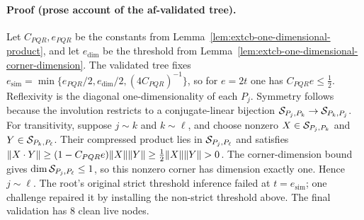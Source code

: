 \paragraph{Proof (prose account of the af-validated tree).}
Let $C_{PQR},e_{PQR}$ be the constants from
Lemma~\ref{lem:extcb-one-dimensional-product}, and let $e_{\dim}$ be the threshold from
Lemma~\ref{lem:extcb-one-dimensional-corner-dimension}. The validated tree fixes
$e_{\mathrm{sim}}=\min\{e_{PQR}/2,e_{\dim}/2,(4C_{PQR})^{-1}\}$, so for $e=2t$
one has $C_{PQR}e\le\tfrac12$. Reflexivity is the diagonal one-dimensionality of each
$P_j$. Symmetry follows because the involution restricts to a conjugate-linear bijection
$\mathcal S_{P_j,P_k}\to\mathcal S_{P_k,P_j}$.
For transitivity, suppose $j\sim k$ and $k\sim\ell$, and choose nonzero
$X\in\mathcal S_{P_j,P_k}$ and $Y\in\mathcal S_{P_k,P_\ell}$. Their compressed product lies in
$\mathcal S_{P_j,P_\ell}$ and satisfies
$\lVert X\mathbin{\cdot} Y\rVert\ge(1-C_{PQR}e)\lVert X\rVert\lVert Y\rVert\ge\tfrac12\lVert X\rVert\lVert Y\rVert>0$.
The corner-dimension bound gives $\dim\mathcal S_{P_j,P_\ell}\le1$, so this nonzero corner
has dimension exactly one. Hence $j\sim\ell$. The root's original strict threshold
inference failed at $t=e_{\mathrm{sim}}$; one challenge repaired it by installing the
non-strict threshold above. The final validation has $8$ clean live nodes.
